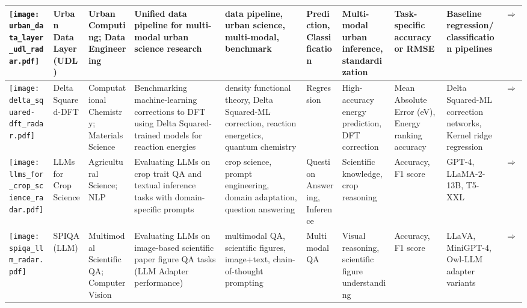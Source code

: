 \begin{landscape}
{\begin{longtable}{|p{}|p{}|p{}|p{}|p{}|p{}|p{}|p{}|p{}|p{}|}
\texttt{[image: urban\_data\_layer\_udl\_radar.pdf]} & Urban Data Layer (UDL) & Urban Computing; Data Engineering & Unified data pipeline for multi-modal urban science research & data pipeline, urban science, multi-modal, benchmark & Prediction, Classification & Multi-modal urban inference, standardization & Task-specific accuracy or RMSE & Baseline regression/classification pipelines & \cite{neurips2024_0db7f135}\href{https://neurips.cc/virtual/2024/poster/97837}{$\Rightarrow$} \\ \hline
\texttt{[image: delta\_squared-dft\_radar.pdf]} & Delta Squared-DFT & Computational Chemistry; Materials Science & Benchmarking machine-learning corrections to DFT using Delta Squared-trained models for reaction energies & density functional theory, Delta Squared-ML correction, reaction energetics, quantum chemistry & Regression & High-accuracy energy prediction, DFT correction & Mean Absolute Error (eV), Energy ranking accuracy & Delta Squared-ML correction networks, Kernel ridge regression & \cite{khrabrov2024nabla2dftuniversalquantumchemistry}\href{https://neurips.cc/virtual/2024/poster/97788}{$\Rightarrow$} \\ \hline
\texttt{[image: llms\_for\_crop\_science\_radar.pdf]} & LLMs for Crop Science & Agricultural Science; NLP & Evaluating LLMs on crop trait QA and textual inference tasks with domain-specific prompts & crop science, prompt engineering, domain adaptation, question answering & Question Answering, Inference & Scientific knowledge, crop reasoning & Accuracy, F1 score & GPT-4, LLaMA-2-13B, T5-XXL & \cite{shen2024exploringuserretrievalintegration}\href{https://neurips.cc/virtual/2024/poster/97570}{$\Rightarrow$} \\ \hline
\texttt{[image: spiqa\_llm\_radar.pdf]} & SPIQA (LLM) & Multimodal Scientific QA; Computer Vision & Evaluating LLMs on image-based scientific paper figure QA tasks (LLM Adapter performance) & multimodal QA, scientific figures, image+text, chain-of-thought prompting & Multimodal QA & Visual reasoning, scientific figure understanding & Accuracy, F1 score & LLaVA, MiniGPT-4, Owl-LLM adapter variants & \cite{pramanick2025spiqadatasetmultimodalquestion}\href{https://neurips.cc/virtual/2024/poster/97575}{$\Rightarrow$} \\ \hline
\end{longtable}
}

\end{landscape}
